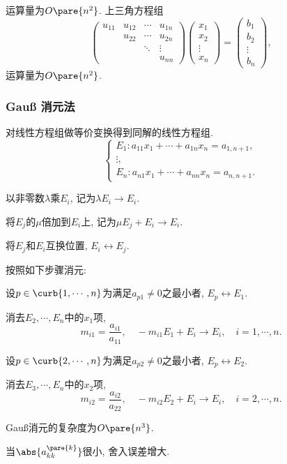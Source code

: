 \documentclass[hidelinks]{ctexart}
\begin{document}
运算量为$O\pare{n^2}$. 上三角方程组
\[ \begin{pmatrix}
    u_{11} & u_{12} & \cdots & u_{1n} \\
           & u_{22} & \cdots & u_{2n} \\
     &  & \ddots & \vdots \\
     & & & u_{nn}
\end{pmatrix}\begin{pmatrix}
    x_1 \\ x_2 \\ \vdots \\ x_n
\end{pmatrix} = \begin{pmatrix}
    b_1 \\ b_2 \\ \vdots \\ b_n
\end{pmatrix}, \]
运算量为$O\pare{n^2}$.


\subsubsection{\texorpdfstring{Gau\ss}{Gauss} 消元法} %
\label{ssub:gauss_消元法}

对线性方程组做等价变换得到同解的线性方程组.
\[ \begin{cases}
    E_1: a_{11}x_1 + \cdots + a_{1n}x_n = a_{1,n+1}, \\
    \vdots, \\
    E_n: a_{n1}x_1 + \cdots + a_{nn}x_n = a_{n,n+1}.
\end{cases} \]
\begin{cenum}
    \item 以非零数$\lambda$乘$E_i$, 记为$\lambda E_i \rightarrow E_i$.
    \item 将$E_j$的$\mu$倍加到$E_i$上, 记为$\mu E_j + E_i \rightarrow E_i$.
    \item 将$E_j$和$E_i$互换位置, $E_i \leftrightarrow E_j$.
\end{cenum}
按照如下步骤消元:
\begin{cenum}
    \item 设$p\in \curb{1,\cdots,n}$为满足$a_{p1}\neq 0$之最小者, $E_p \leftrightarrow E_1$.
    \item 消去$E_2,\cdots,E_n$中的$x_1$项,
    \[ m_{i1} = \frac{a_{i1}}{a_{11}},\quad -m_{i1} E_1 + E_i \rightarrow E_i, \quad i = 1,\cdots,n. \]
    \item 设$p\in \curb{2,\cdots,n}$为满足$a_{p2}\neq 0$之最小者, $E_p \leftrightarrow E_2$.
    \item 消去$E_3,\cdots,E_n$中的$x_2$项,
    \[ m_{i2} = \frac{a_{i2}}{a_{22}},\quad -m_{i2} E_2 + E_i \rightarrow E_i,\quad i = 2,\cdots,n. \]
\end{cenum}
Gau\ss 消元的复杂度为$O\pare{n^3}$.
\begin{remark}
    当$\abs{a_{kk}^{\pare{k}}}$很小, 舍入误差增大.
\end{remark}
\end{document}
